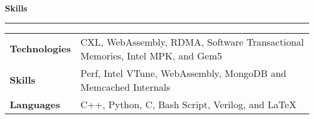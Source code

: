 \documentclass{article}
\newlength{\durlen}
\newlength{\deslen}
\newcommand{\sectiontitle}[1]{
  \textbf{\Large{\sffamily #1}}
  \begin{flushright}
      \vspace{-0.48cm} 
      \rule{0.975\textwidth}{1.1pt}
  \end{flushright}
  \vspace{-0.1cm} 
}
\begin{document}

    
        
 
        
    \sectiontitle{\sffamily Skills}
    
    \begin{tabular}{p{\durlen} p{\deslen}}
    \centering \textbf{Technologies} & \hspace{0.5cm}CXL, WebAssembly, RDMA, Software Transactional Memories, Intel MPK, and Gem5\\[1mm]
    \centering \textbf{Skills} & \hspace{0.5cm}Perf, Intel VTune, WebAssembly, MongoDB and Memcached Internals\\[1mm]
    \centering \textbf{Languages} & \hspace{0.5cm}C++, Python, C, Bash Script, Verilog, and \LaTeX\\[1mm]
    \end{tabular}
    
    
     
\end{document}
